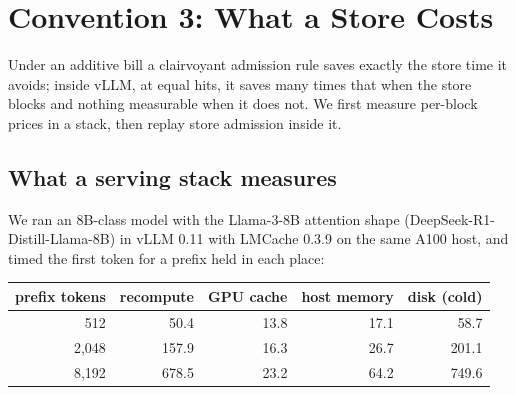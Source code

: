 \section{Convention 3: What a Store Costs}
\label{sec:writepath}
Under an additive bill a clairvoyant admission rule saves exactly the store time it avoids; inside vLLM, at
equal hits, it saves many times that when the store blocks and nothing measurable when it does not. We first
measure per-block prices in a stack, then replay store admission inside it.

\subsection{What a serving stack measures}
\label{sec:serving}
We ran an 8B-class model with the Llama-3-8B attention shape (DeepSeek-R1-Distill-Llama-8B) in vLLM 0.11
with LMCache 0.3.9 on the same A100 host, and timed the first token for a prefix held in each place:

\begin{center}\footnotesize\setlength{\tabcolsep}{4pt}
\begin{tabular}{@{}rrrrr@{}}
\toprule
prefix tokens & recompute & GPU cache & host memory & disk (cold) \\
\midrule
512 & 50.4 & 13.8 & 17.1 & 58.7 \\
2,048 & 157.9 & 16.3 & 26.7 & 201.1 \\
8,192 & 678.5 & 23.2 & 64.2 & 749.6 \\
\bottomrule
\end{tabular}
\end{center}

